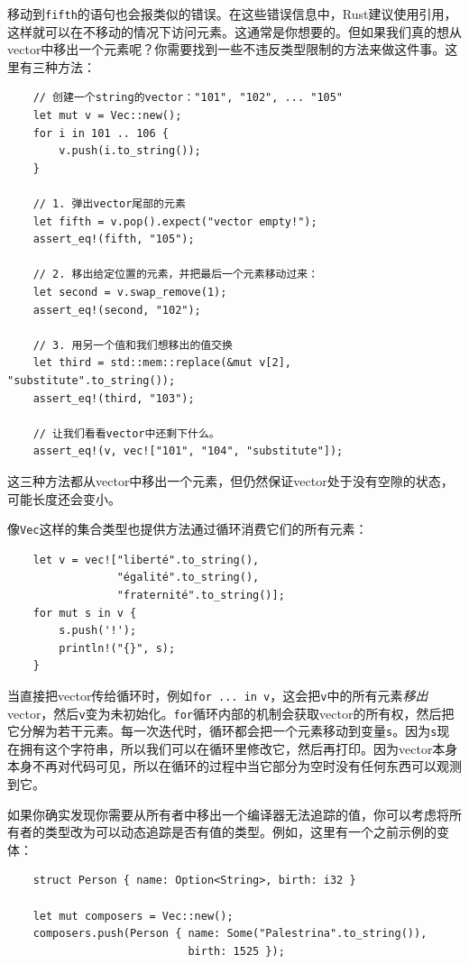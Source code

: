 移动到\texttt{fifth}的语句也会报类似的错误。在这些错误信息中，Rust建议使用引用，这样就可以在不移动的情况下访问元素。这通常是你想要的。但如果我们真的想从vector中移出一个元素呢？你需要找到一些不违反类型限制的方法来做这件事。这里有三种方法：
\begin{verbatim}
    // 创建一个string的vector："101", "102", ... "105"
    let mut v = Vec::new();
    for i in 101 .. 106 {
        v.push(i.to_string());
    }

    // 1. 弹出vector尾部的元素
    let fifth = v.pop().expect("vector empty!");
    assert_eq!(fifth, "105");

    // 2. 移出给定位置的元素，并把最后一个元素移动过来：
    let second = v.swap_remove(1);
    assert_eq!(second, "102");

    // 3. 用另一个值和我们想移出的值交换
    let third = std::mem::replace(&mut v[2], "substitute".to_string());
    assert_eq!(third, "103");

    // 让我们看看vector中还剩下什么。
    assert_eq!(v, vec!["101", "104", "substitute"]);
\end{verbatim}

这三种方法都从vector中移出一个元素，但仍然保证vector处于没有空隙的状态，可能长度还会变小。

像\texttt{Vec}这样的集合类型也提供方法通过循环消费它们的所有元素：
\begin{verbatim}
    let v = vec!["liberté".to_string(),
                 "égalité".to_string(),
                 "fraternité".to_string()];
    for mut s in v {
        s.push('!');
        println!("{}", s);
    }
\end{verbatim}

当直接把vector传给循环时，例如\texttt{for ... in v}，这会把\texttt{v}中的所有元素\emph{移出}vector，然后\texttt{v}变为未初始化。\texttt{for}循环内部的机制会获取vector的所有权，然后把它分解为若干元素。每一次迭代时，循环都会把一个元素移动到变量\texttt{s}。因为\texttt{s}现在拥有这个字符串，所以我们可以在循环里修改它，然后再打印。因为vector本身本身不再对代码可见，所以在循环的过程中当它部分为空时没有任何东西可以观测到它。

如果你确实发现你需要从所有者中移出一个编译器无法追踪的值，你可以考虑将所有者的类型改为可以动态追踪是否有值的类型。例如，这里有一个之前示例的变体：
\begin{verbatim}
    struct Person { name: Option<String>, birth: i32 }

    let mut composers = Vec::new();
    composers.push(Person { name: Some("Palestrina".to_string()),
                            birth: 1525 });
\end{verbatim}

